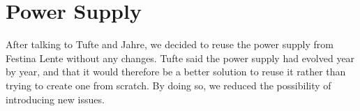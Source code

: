 \section {Power Supply}

After talking to Tufte and Jahre, we decided to reuse the power supply
from Festina Lente without any changes. Tufte said the power supply had evolved year by
year, and that it would therefore be a better solution to reuse it rather
than trying to create one from scratch. By doing so, we reduced the possibility 
of introducing new issues.
